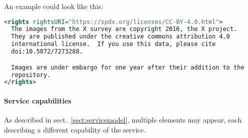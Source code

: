 \documentclass[11pt,a4paper]{ivoa}
\begin{document}

An example could look like this:

\begin{lstlisting}[language=XML,basicstyle=\footnotesize]
<rights rightsURI="https://spdx.org/licenses/CC-BY-4.0.html">
  The images from the X survey are copyright 2016, the X project.
  They are published under the creative commons attribution 4.0
  international license.  If you use this data, please cite
  doi:10.5072/7273288.

  Images are under embargo for one year after their addition to the
  repository.
</rights>
\end{lstlisting}

\paragraph{Service capabilities}

As described in sect.~\ref{sect:servicemodel}, multiple
 elements may appear, each describing a
different capability of the service.
\end{document}
